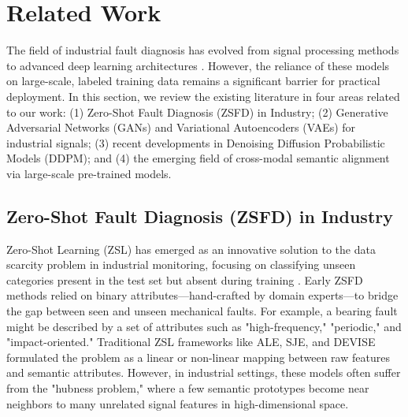 \section{Related Work}
\label{sec:related_work}

The field of industrial fault diagnosis has evolved from signal processing methods to advanced deep learning architectures \cite{li2020deep,zhao2022deep}. However, the reliance of these models on large-scale, labeled training data remains a significant barrier for practical deployment. In this section, we review the existing literature in four areas related to our work: (1) Zero-Shot Fault Diagnosis (ZSFD) in Industry; (2) Generative Adversarial Networks (GANs) and Variational Autoencoders (VAEs) for industrial signals; (3) recent developments in Denoising Diffusion Probabilistic Models (DDPM); and (4) the emerging field of cross-modal semantic alignment via large-scale pre-trained models.

\subsection{Zero-Shot Fault Diagnosis (ZSFD) in Industry}
Zero-Shot Learning (ZSL) has emerged as an innovative solution to the data scarcity problem in industrial monitoring, focusing on classifying unseen categories present in the test set but absent during training \cite{fu2015transductive}. Early ZSFD methods relied on binary attributes—hand-crafted by domain experts—to bridge the gap between seen and unseen mechanical faults. For example, a bearing fault might be described by a set of attributes such as "high-frequency," "periodic," and "impact-oriented." Traditional ZSL frameworks like ALE, SJE, and DEVISE formulated the problem as a linear or non-linear mapping between raw features and semantic attributes. However, in industrial settings, these models often suffer from the "hubness problem," where a few semantic prototypes become near neighbors to many unrelated signal features in high-dimensional space.

